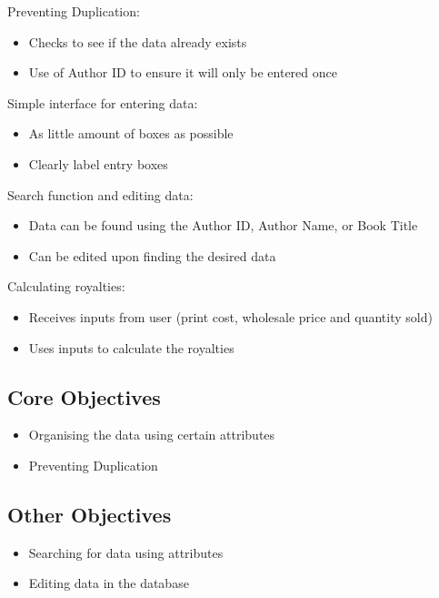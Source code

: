 Preventing Duplication:

\begin{itemize}
    \item Checks to see if the data already exists
    \item Use of Author ID to ensure it will only be entered once
\end{itemize}


Simple interface for entering data:

\begin{itemize}
    \item As little amount of boxes as possible
    \item Clearly label entry boxes
\end{itemize}


Search function and editing data:

\begin{itemize}
    \item Data can be found using the Author ID, Author Name, or Book Title
    \item Can be edited upon finding the desired data
\end{itemize}


Calculating royalties:

\begin{itemize}
    \item Receives inputs from user (print cost, wholesale price and quantity sold)
    \item Uses inputs to calculate the royalties
\end{itemize}

\subsection{Core Objectives}

\begin{itemize}
    \item Organising the data using certain attributes
    \item Preventing Duplication
\end{itemize}

\subsection{Other Objectives}

\begin{itemize}
    \item Searching for data using attributes
    \item Editing data in the database
\end{itemize}

